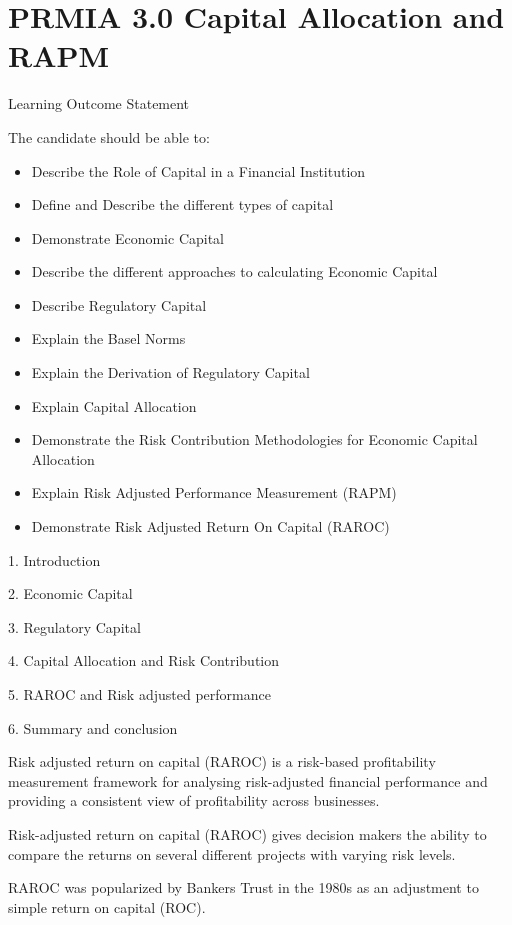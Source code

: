 
\section{PRMIA 3.0 Capital Allocation and RAPM}
Learning Outcome Statement

The candidate should be able to:

\begin{itemize}
\item  Describe the Role of Capital in a Financial Institution
\item  Define and Describe the different types of capital
\item  Demonstrate Economic Capital
\item  Describe the different approaches to calculating Economic Capital
\item  Describe Regulatory Capital
\item  Explain the Basel Norms
\item  Explain the Derivation of Regulatory Capital
\item  Explain Capital Allocation
\item  Demonstrate the Risk Contribution Methodologies for Economic Capital Allocation
\item  Explain Risk Adjusted Performance Measurement (RAPM)
\item  Demonstrate Risk Adjusted Return On Capital (RAROC)
\end{itemize}


1. Introduction

2. Economic Capital

3. Regulatory Capital

4. Capital Allocation and Risk Contribution

5. RAROC and Risk adjusted performance

6. Summary and conclusion

Risk adjusted return on capital (RAROC) is a risk-based profitability measurement framework for analysing risk-adjusted financial performance and providing a consistent view of profitability across businesses. 


Risk-adjusted return on capital (RAROC) gives decision makers the ability to compare the returns on several different projects with varying risk levels.


RAROC was popularized by Bankers Trust in the 1980s as an adjustment to simple return on capital (ROC).



